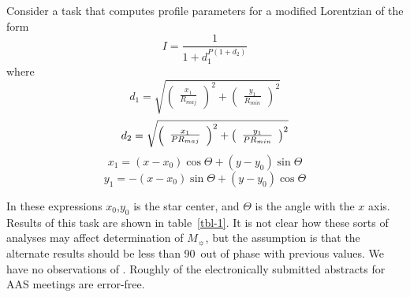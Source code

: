 \documentclass[manuscript]{../aastex52/aastex}
\begin{document}

Consider a task that computes profile parameters for a modified
Lorentzian of the form
\begin{equation}
I = \frac{1}{1 + d_{1}^{P (1 + d_{2} )}}
\end{equation}
where
\begin{displaymath}
d_{1} = \sqrt{ \left( \begin{array}{c} \frac{x_{1}}{R_{maj}}
\end{array} \right) ^{2} +
\left( \begin{array}{c} \frac{y_{1}}{R_{min}} \end{array} \right) ^{2} }
\end{displaymath}
\begin{displaymath}
d_{2} = \sqrt{ \left( \begin{array}{c} \frac{x_{1}}{P R_{maj}}
\end{array} \right) ^{2} +
\left( \begin{array}{c} \mbox{$\frac{y_{1}}{P R_{min}}$} \end{array} \right) ^{2} }
\end{displaymath}
\begin{displaymath}
x_{1} = (x - x_{0}) \cos \Theta + (y - y_{0}) \sin \Theta
\end{displaymath}
\begin{displaymath}
y_{1} = -(x - x_{0}) \sin \Theta + (y - y_{0}) \cos \Theta
\end{displaymath}

In these expressions $x_{0}$,$y_{0}$ is the star center, and $\Theta$ is the
angle with the $x$ axis.  Results of this task are shown in table~\ref{tbl-1}.
It is not clear how these sorts of analyses may affect determination of
 $M_{\sun}$, but the assumption is that the alternate results
should be less than 90\degr\ out of phase with previous values.
We have no observations of .
Roughly  of the electronically submitted abstracts
for AAS meetings are error-free.


\end{document}
